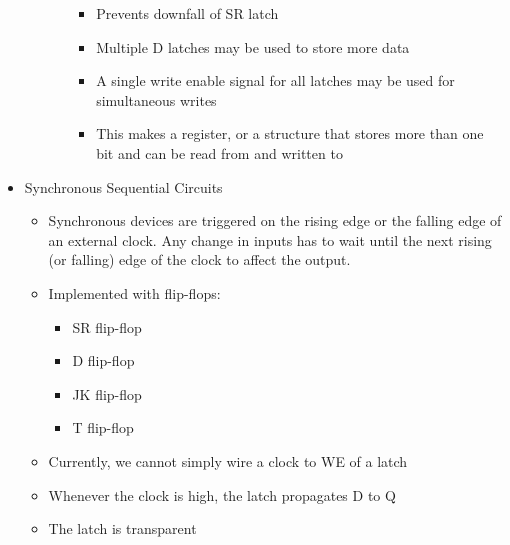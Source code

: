 \begin{itemize}
\begin{itemize}
\begin{itemize}
\begin{itemize}
              \item Prevents downfall of SR latch

              \item Multiple D latches may be used to store more data

              \item A single write enable signal for all latches may be used for simultaneous writes

              \item This makes a register, or a structure that stores more than one bit and can be read from and written to

            \end{itemize}

        \end{itemize}

    \end{itemize}

  \item Synchronous Sequential Circuits

    \begin{itemize}

      \item Synchronous devices are triggered on the rising edge or the falling edge of an external clock. Any change in inputs has to wait until the next rising (or falling) edge of the clock to affect the output.

      \item Implemented with flip-flops:

        \begin{itemize}

          \item SR flip-flop

          \item D flip-flop

          \item JK flip-flop

          \item T flip-flop

        \end{itemize}

      \item Currently, we cannot simply wire a clock to WE of a latch

      \item Whenever the clock is high, the latch propagates D to Q

      \item The latch is transparent

    \end{itemize}

\end{itemize}



